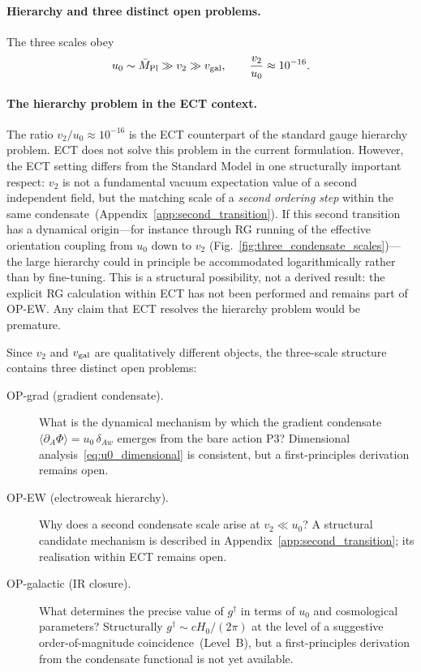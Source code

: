 \documentclass[11pt,a4paper]{article}
\numberwithin{equation}{section}
\begin{document}
\paragraph{Hierarchy and three distinct open problems.}
The three scales obey
\begin{equation}
  u_0 \sim \bar{M}_{\rm Pl} \gg v_2 \gg v_{\rm gal},
  \qquad
  \frac{v_2}{u_0} \approx 10^{-16}.
  \label{eq:hierarchy}
\end{equation}

\paragraph{The hierarchy problem in the ECT context.}
The ratio $v_2/u_0\approx 10^{-16}$ is the ECT counterpart of the
standard gauge hierarchy problem.
ECT does not solve this problem in the current formulation.
However, the ECT setting differs from the Standard Model in one
structurally important respect: $v_2$ is not a fundamental vacuum
expectation value of a second independent field, but the matching
scale of a \emph{second ordering step} within the same
condensate~(Appendix~\ref{app:second_transition}).
If this second transition has a dynamical origin---for instance
through RG running of the effective orientation coupling from
$u_0$ down to $v_2$ (Fig.~\ref{fig:three_condensate_scales})---the
large hierarchy could in principle be accommodated logarithmically
rather than by fine-tuning.
This is a structural possibility, not a derived result:
the explicit RG calculation within ECT has not been performed and
remains part of OP-EW.
Any claim that ECT resolves the hierarchy problem would be
premature.

Since $v_2$ and $v_{\rm gal}$ are qualitatively different
objects, the three-scale structure contains three distinct open
problems:
\begin{description}
  \item[OP-grad (gradient condensate).]
    What is the dynamical mechanism by which the gradient
    condensate $\langle\partial_A\Phi\rangle = u_0\,\delta_{Aw}$
    emerges from the bare action P3?
    Dimensional analysis~\eqref{eq:u0_dimensional} is consistent,
    but a first-principles derivation remains open.
  \item[OP-EW (electroweak hierarchy).]
    Why does a second condensate scale arise at $v_2\ll u_0$?
    A structural candidate mechanism is described in
    Appendix~\ref{app:second_transition}; its realisation
    within ECT remains open.
  \item[OP-galactic (IR closure).]
    What determines the precise value of $g^\dagger$ in
    terms of $u_0$ and cosmological parameters?
    Structurally $g^\dagger\sim cH_0/(2\pi)$ at the level of a suggestive
    order-of-magnitude coincidence~(Level~B), but a
    first-principles derivation from the condensate
    functional is not yet available.
\end{description}
\end{document}
